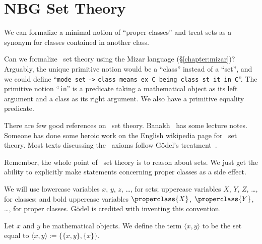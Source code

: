 \section{NBG Set Theory}\label{sec:set:nbg}
\begin{node}\label{nbg-0000}%
We can formalize a minimal notion of ``proper classes'' and treat
sets as a synonym for classes contained in another class.
\end{node}

\begin{puzzle}\label{nbg-0001}%
Can we formalize \NBG\ set theory using the Mizar language (\S\ref{chapter:mizar})? Arguably, the
unique primitive notion would be a ``class'' instead of a ``set'', and
we could define ``\texttt{mode set} \verb|->| \texttt{class means ex C
  being class st it in C}''. The primitive notion ``\texttt{in}'' is a
predicate taking a mathematical object as its left argument and a class
as its right argument. We also have a primitive equality predicate.

\begin{node}[References]\label{nbg-0002}%
There are few good references on \NBG\ set
theory. Banakh~\cite{banakh2023classical} has some lecture
notes. Someone has done some heroic work on the English wikipedia page
for \NBG\ set theory. Most texts discussing the \NBG\ axioms follow
G\"{o}del's treatment~\cite{godel1940consistency}.
\end{node}

\begin{node}\label{nbg-0003}%
Remember, the whole point of \NBG\ set theory is to reason about sets. We
just get the ability to explicitly make statements concerning proper
classes as a side effect.
\end{node}
\end{puzzle}

\begin{node}[Conventions]\label{nbg-000F}%
We will use lowercase variables $x$, $y$, $z$, \dots, for sets;
uppercase variables $X$, $Y$, $Z$, \dots, for classes; and bold
uppercase variables $\properclass{X}$, $\properclass{Y}$, \dots, for proper classes.
G\"{o}del is credited with inventing this convention.
\end{node}

\begin{definition}\label{nbg-0007}%
Let $x$ and $y$ be mathematical objects. We define the term $\langle x,y\rangle$
to be the set equal to $\langle x,y\rangle := \{\{x,y\}, \{x\}\}$.
\end{definition}

